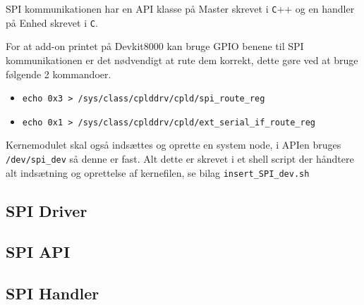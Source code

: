 


SPI kommunikationen har en API klasse på Master skrevet i \verb+C+++ og en handler på Enhed skrevet i \verb+C+.

For at add-on printet på Devkit8000 kan bruge GPIO benene til SPI kommunikationen er det nødvendigt at rute dem korrekt, dette gøre ved at bruge følgende 2 kommandoer.

\begin{itemize}
\item \verb+echo 0x3 > /sys/class/cplddrv/cpld/spi_route_reg+
\item \verb+echo 0x1 > /sys/class/cplddrv/cpld/ext_serial_if_route_reg+
\end{itemize}

Kernemodulet skal også indsættes og oprette en system node, i APIen bruges \verb+/dev/spi_dev+ så denne er fast.
Alt dette er skrevet i et shell script der håndtere alt indsætning og oprettelse af kernefilen, se bilag \verb+insert_SPI_dev.sh+


\subsection{SPI Driver}



\subsection{SPI API}




\subsection{SPI Handler}



